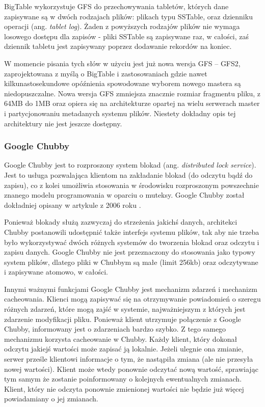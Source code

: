 BigTable wykorzystuje GFS do przechowywania tabletów, których dane zapisywane są w dwóch rodzajach plików: plikach typu SSTable, oraz dzienniku operacji (ang. \emph{tablet log}).
Żaden z powyższych rodzajów plików nie wymaga losowego dostępu dla zapisów - pliki SSTable są zapisywane raz, w całości, zaś dziennik tabletu jest zapisywany poprzez dodawanie rekordów na koniec.

W momencie pisania tych słów w użyciu jest już nowa wersja GFS -- GFS2, zaprojektowana z myślą o BigTable i zastosowaniach gdzie nawet kilkunastosekundowe opóźnienia spowodowane wyborem nowego mastera są niedopuszczalne.
Nowa wersja GFS zmniejsza znacznie rozmiar fragmentu pliku, z 64MB do 1MB oraz opiera się na architekturze opartej na wielu serwerach master i partycjonowaniu metadanych systemu plików.
Niestety dokładny opis tej architektury nie jest jeszcze dostępny.

\subsubsection*{Google Chubby}
\label{sec:google-chubby}

Google Chubby jest to rozproszony system blokad (ang. \emph{distributed lock service}).
Jest to usługa pozwalająca klientom na zakładanie blokad (do odczytu bądź do zapisu), co z kolei umożliwia stosowania w środowisku rozproszonym powszechnie znanego modelu programowania w oparciu o muteksy.
Google Chubby został dokładniej opisany w artykule z 2006 roku \cite{google-chubby}.

Ponieważ blokady służą zazwyczaj do strzeżenia jakichś danych, architekci Chubby postanowili udostępnić także interfejs systemu plików, tak aby nie trzeba było wykorzystywać dwóch różnych systemów do tworzenia blokad oraz odczytu i zapisu danych.
Google Chubby nie jest przeznaczony do stosowania jako typowy system plików, dlatego pliki w Chubbym są małe (limit 256kb) oraz odczytywane i zapisywane atomowo, w całości.

Innymi ważnymi funkcjami Google Chubby jest mechanizm zdarzeń i mechanizm cacheowania.
Klienci mogą zapisywać się na otrzymywanie powiadomień o szeregu różnych zdarzeń, które mogą zajść w systemie, najważniejszym z których jest zdarzenie modyfikacji pliku.
Ponieważ klient utrzymuje połączenie z Google Chubby, informowany jest o zdarzeniach bardzo szybko.
Z tego samego mechanizmu korzysta cacheowanie w Chubby.
Każdy klient, który dokonał odczytu jakiejś wartości może zapisać ją lokalnie.
Jeżeli ulegnie ona zmianie, serwer prześle klientowi informacje o tym, że nastąpiła zmiana (ale nie przesyła nowej wartości).
Klient może wtedy ponownie odczytać nową wartość, sprawiając tym samym że zostanie poinformowany o kolejnych ewentualnych zmianach.
Klient, który nie odczyta ponownie zmienionej wartości nie będzie już więcej powiadamiany o jej zmianach.

